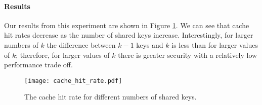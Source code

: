 \paragraph{Results}
Our results from this experiment are shown in Figure \ref{fig:cache_hits}.  We can see that cache hit rates decrease 
as the number of shared keys increase.  Interestingly, for larger numbers of $k$ the difference between $k-1$ keys and $k$ is less than for larger 
values of $k$; therefore, for larger values of $k$ there is greater security with a relatively low performance trade off.

\begin{figure}[t]
\centering
\texttt{[image: cache\_hit\_rate.pdf]}
\caption{The cache hit rate for different numbers of shared keys.}
\label{fig:cache_hits}
\end{figure}
